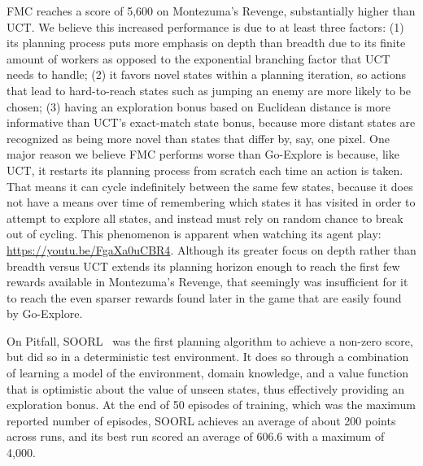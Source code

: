 \documentclass{article}
\begin{document}
FMC reaches a score of 5,600 on Montezuma's Revenge, substantially higher than UCT. We believe this increased performance is due to at least three factors: (1) its planning process puts more emphasis on depth than breadth due to its finite amount of workers as opposed to the exponential branching factor that UCT needs to handle; (2) it favors novel states within a planning iteration, so actions that lead to hard-to-reach states such as jumping an enemy are more likely to be chosen; (3) having an exploration bonus based on Euclidean distance is more informative than UCT's exact-match state bonus, because more distant states are recognized as being more novel than states that differ by, say, one pixel. One major reason we believe FMC performs worse than Go-Explore is because, like UCT, it restarts its planning process from scratch each time an action is taken. That means it can cycle indefinitely between the same few states, because it does not have a means over time of remembering which states it has visited in order to attempt to explore all states, and instead must rely on random chance to break out of cycling. This phenomenon is apparent when watching its agent play: \url{https://youtu.be/FgaXa0uCBR4}. 
Although its greater focus on depth rather than breadth versus UCT extends its planning horizon enough to reach the first few rewards available in Montezuma's Revenge, that seemingly was insufficient for it to reach the even sparser rewards found later in the game that are easily found by Go-Explore.

On Pitfall, SOORL~\cite{Keramati2018FastEW} was the first planning algorithm to achieve a non-zero score, but did so in a deterministic test environment. It does so through a combination of learning a model of the environment, domain knowledge, and a value function that is optimistic about the value of unseen states, thus effectively providing an exploration bonus. At the end of 50 episodes of training, which was the maximum reported number of episodes, SOORL achieves an average of about 200 points across runs, and its best run scored an average of 606.6 with a maximum of 4,000.
\end{document}
